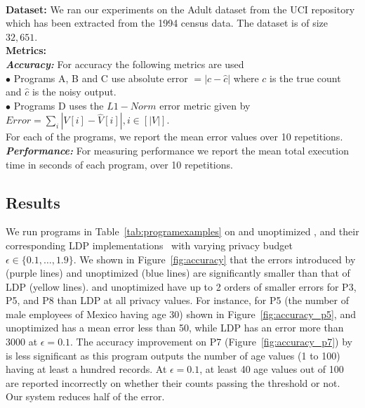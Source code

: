 {\\\textbf{Dataset:}
We ran our experiments on the Adult dataset from the UCI repository \cite{UCI}  which has been extracted from the 1994 census data. The dataset is of size $32,651$.
\\\textbf{Metrics:}
\\\textbf{\textit{Accuracy:}} For accuracy the following metrics are used
\\$\bullet$ Programs A, B and C use absolute error $ =|c-\hat{c}|$ where $c$ is the true count and $\hat{c}$ is the noisy output.\\ $\bullet$ Programs D uses the $L1-Norm$ error metric given  by $Error=\sum_{i}|V[i]-\hat{V}[i]|, i \in [|V|]$.\\
For each of the programs, we report the mean error values over 10 repetitions.\\
\textbf{\textit{Performance:}} For measuring performance we report the mean total execution time in seconds of each program, over 10 repetitions. 
}



\subsection{Results}\label{sec:results}
 We run programs in Table~\ref{tab:programexamples} on \system and unoptimized \system, and their corresponding LDP implementations~\cite{LDP1} with varying privacy budget $\epsilon \in \{0.1,\ldots,1.9\}$. We shown in Figure~\ref{fig:accuracy} that the errors introduced by \system (purple lines) and unoptimized \system (blue lines) are significantly smaller than that of LDP (yellow lines). \system and unoptimized \system have up to 2 orders of smaller errors for P3, P5, and P8 than LDP at all privacy values. For instance, for P5 (the number of male employees of Mexico having age 30) shown in Figure~\ref{fig:accuracy_p5}, \system and unoptimized \system has a mean error less than 50, while LDP has an error more than $3000$ at $\epsilon=0.1$.  The accuracy improvement on P7 (Figure~\ref{fig:accuracy_p7}) by \system is less significant as this program outputs the number of age values (1 to 100) having at least a hundred records. At $\epsilon=0.1$, at least 40 age values out of 100 are reported incorrectly on whether their counts passing the threshold or not. Our system reduces half of the error.

